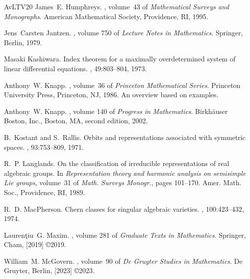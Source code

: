 \documentclass[a4paper, 11pt]{article}
\begin{document}
\begin{thebibliography}{AvLTV20}
James~E. Humphreys.
, volume~43 of
  {\em Mathematical Surveys and Monographs}.
\newblock American Mathematical Society, Providence, RI, 1995.

Jens~Carsten Jantzen.
, volume 750 of {\em
  Lecture Notes in Mathematics}.
\newblock Springer, Berlin, 1979.

Masaki Kashiwara.
\newblock Index theorem for a maximally overdetermined system of linear
  differential equations.
, 49:803--804, 1973.

Anthony~W. Knapp.
, volume~36 of {\em
  Princeton Mathematical Series}.
\newblock Princeton University Press, Princeton, NJ, 1986.
\newblock An overview based on examples.

Anthony~W. Knapp.
, volume 140 of {\em Progress
  in Mathematics}.
\newblock Birkh\"{a}user Boston, Inc., Boston, MA, second edition, 2002.

B.~Kostant and S.~Rallis.
\newblock Orbits and representations associated with symmetric spaces.
, 93:753--809, 1971.

R.~P. Langlands.
\newblock On the classification of irreducible representations of real
  algebraic groups.
\newblock In {\em Representation theory and harmonic analysis on semisimple
  {L}ie groups}, volume~31 of {\em Math. Surveys Monogr.}, pages 101--170.
  Amer. Math. Soc., Providence, RI, 1989.

R.~D. MacPherson.
\newblock Chern classes for singular algebraic varieties.
, 100:423--432, 1974.

Lauren\c tiu~G. Maxim.
, volume 281 of {\em Graduate Texts in Mathematics}.
\newblock Springer, Cham, [2019] \copyright 2019.

William~M. McGovern.
,
  volume~90 of {\em De Gruyter Studies in Mathematics}.
\newblock De Gruyter, Berlin, [2023] \copyright 2023.


\end{thebibliography}
\end{document}
